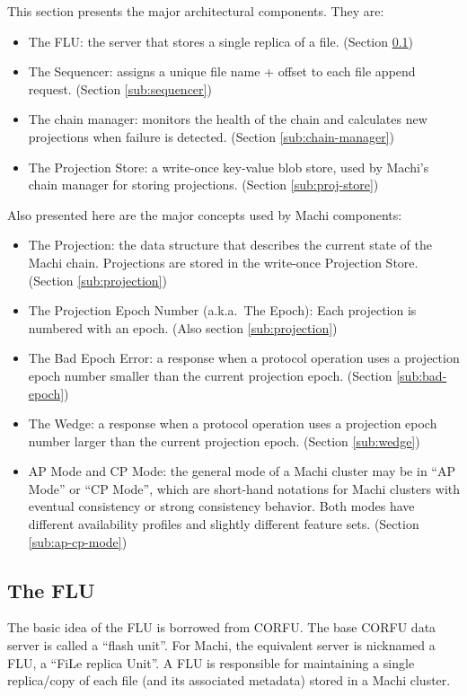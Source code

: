 \documentclass[preprint,10pt]{sigplanconf}
\begin{document}
This section presents the major architectural components.  They are:

\begin{itemize}
\item The FLU: the server that stores a single replica of a file.
(Section \ref{sub:flu})
\item The Sequencer: assigns a unique file name + offset to each file
  append request.
(Section \ref{sub:sequencer})
\item The chain manager: monitors the health of the
  chain and calculates new projections when failure is detected.
(Section \ref{sub:chain-manager})
\item The Projection Store: a write-once key-value blob store, used by
  Machi's chain manager for storing projections.
(Section \ref{sub:proj-store})
\end{itemize}

Also presented here are the major concepts used by Machi components:
\begin{itemize}
\item The Projection: the data structure that describes the current
  state of the Machi chain.  
  Projections are stored in the write-once Projection Store.
(Section \ref{sub:projection})
\item The Projection Epoch Number (a.k.a.~The Epoch): Each projection
  is numbered with an epoch.
(Also section \ref{sub:projection})
\item The Bad Epoch Error: a response when a protocol operation uses a
  projection epoch number smaller than the current projection epoch.
(Section \ref{sub:bad-epoch})
\item The Wedge: a response when a protocol operation uses a
  projection epoch number larger than the current projection epoch.
(Section \ref{sub:wedge})
\item AP Mode and CP Mode: the general mode of a Machi cluster may be
  in ``AP Mode'' or ``CP Mode'', which are short-hand notations for
  Machi clusters with eventual consistency or strong consistency
  behavior.  Both modes have different availability profiles and
  slightly different feature sets.  (Section \ref{sub:ap-cp-mode})
\end{itemize}

\subsection{The FLU}
\label{sub:flu}

The basic idea of the FLU is borrowed from CORFU.  The base CORFU
data server is called a ``flash unit''.  For Machi, the equivalent
server is nicknamed a FLU, a ``FiLe replica Unit''.  A FLU is
responsible for maintaining a single replica/copy of each file
(and its associated metadata) stored in a Machi cluster.
\end{document}
